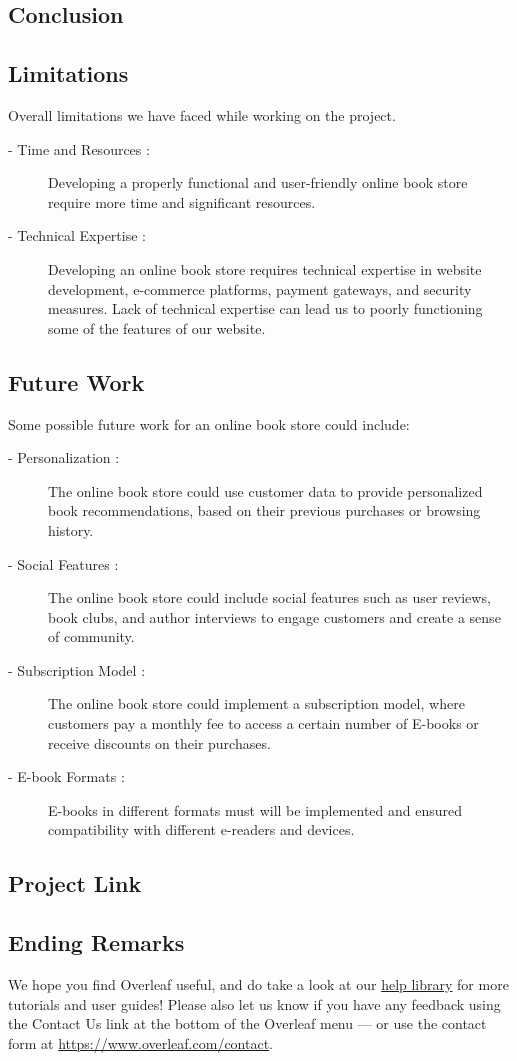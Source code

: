 \documentclass[12pt,a4paper]{article}
\begin{document}
\subsection{Conclusion}
\subsection{Limitations}
Overall limitations we have faced while working on the project.
\begin{description}
    \item[- Time and Resources :] Developing a properly functional and user-friendly online book store require more time and significant resources.
    \item[- Technical Expertise :] Developing an online book store requires technical expertise in website development, e-commerce platforms, payment gateways, and security measures. Lack of technical expertise can lead us to poorly functioning some of the features of our website.
\end{description}
\subsection{Future Work}
Some possible future work for an online book store could include:
\begin{description} 
    \item[- Personalization :] The online book store could use customer data to provide personalized book recommendations, based on their previous purchases or browsing history.
    \item[- Social Features :] The online book store could include social features such as user reviews, book clubs, and author interviews to engage customers and create a sense of community.
    \item[- Subscription Model :] The online book store could implement a subscription model, where customers pay a monthly fee to access a certain number of E-books or receive discounts on their purchases.
    \item[- E-book Formats :] E-books in different formats must will be implemented and ensured compatibility with different e-readers and devices.
\end{description}
\subsection{Project Link}
\subsection{Ending Remarks}

We hope you find Overleaf useful, and do take a look at our \href{https://www.overleaf.com/learn}{help library} for more tutorials and user guides! Please also let us know if you have any feedback using the Contact Us link at the bottom of the Overleaf menu --- or use the contact form at \url{https://www.overleaf.com/contact}.



\end{document}
